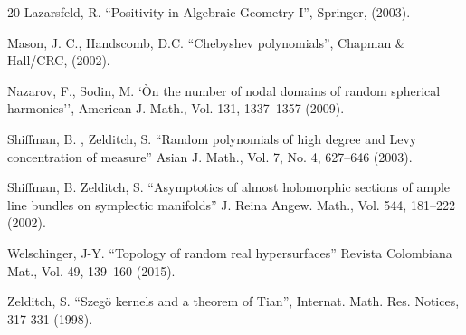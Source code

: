\documentclass [11pt]{amsart}
\theoremstyle{remark}
\numberwithin{equation}{section}
\numberwithin{theorem}{section}
\begin{document}
\begin{thebibliography}{20}
 Lazarsfeld, R. ``Positivity in Algebraic Geometry I'', Springer, (2003). 

 Mason, J. C., Handscomb, D.C. ``Chebyshev polynomials'', Chapman \& Hall/CRC, (2002).

 Nazarov, F.,   Sodin, M. `Òn the number of nodal domains of random spherical harmonics'', American J. Math., Vol. 131, 1337--1357 (2009). 

 Shiffman, B. , Zelditch, S. ``Random polynomials of high degree and Levy concentration of measure''  Asian J. Math., Vol. 7, No. 4, 627--646 (2003).

 Shiffman, B. Zelditch, S. ``Asymptotics of almost holomorphic sections of ample line bundles on symplectic manifolds'' J. Reina Angew. Math., Vol. 544, 181--222 (2002).

 Welschinger, J-Y. ``Topology of random real hypersurfaces'' Revista Colombiana Mat., Vol. 49, 139--160 (2015).

 Zelditch, S. ``Szegö kernels and a theorem of Tian'', Internat. Math. Res. Notices, 317-331 (1998).

\end{thebibliography}
\end{document}
